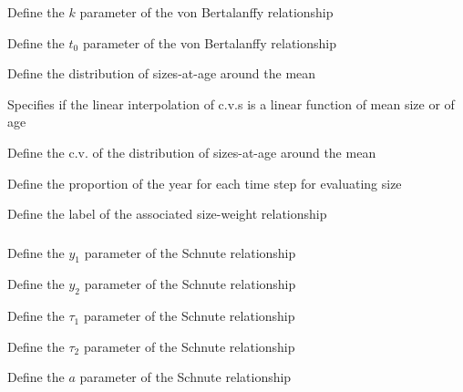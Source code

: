  {Define the $k$ parameter of the von Bertalanffy relationship}

 {Define the $t_0$ parameter of the von Bertalanffy relationship}

 {Define the distribution of sizes-at-age around the mean}

 {Specifies if the linear interpolation of c.v.s is a linear function of mean size or of age}

 {Define the c.v. of the distribution of sizes-at-age around the mean}

 {Define the proportion of the year for each time step for evaluating size}

 {Define the label of the associated size-weight relationship}

\subsubsection[Schnute]{}

 {Define the $y_1$ parameter of the Schnute relationship}

 {Define the $y_2$ parameter of the Schnute relationship}

 {Define the $\tau_1$ parameter of the Schnute relationship}

 {Define the $\tau_2$ parameter of the Schnute relationship}

 {Define the $a$ parameter of the Schnute relationship}

